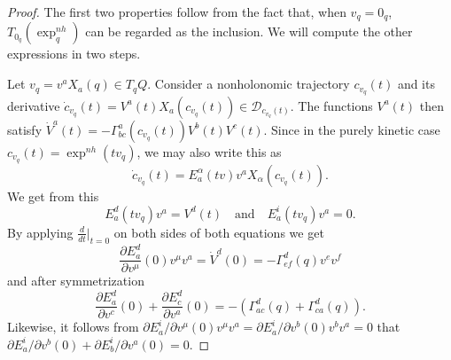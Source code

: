 \documentclass[11pt]{article}
\begin{document}
\begin{proof} The first two properties follow from the fact that, when $v_q=0_q$,   $T_{0_q}(\exp^{nh}_q)$ can be regarded as the inclusion.
We will compute the other expressions in two steps. 

Let $v_q = v^aX_a(q)\in T_qQ$. Consider a nonholonomic trajectory $c_{v_q}(t)$ and its derivative $\dot{c}_{v_q}(t)=V^a(t) X_a\left(c_{v_q}(t)\right) \in \mathcal{D}_{c_{v_q}(t)}$. The functions $V^a(t)$ then satisfy $\dot{V}^a(t)=-\Gamma_{b c}^a\left(c_{v_q}(t)\right) V^b(t) V^c(t)$.
Since in the purely kinetic case {$c_{v_q}(t)=\exp^{nh} \left(t v_q\right)$}, we may also write this as 
\[
\dot{c}_{v_q}(t)=E_a^\alpha(tv) v^a X_\alpha\left(c_{v_q}(t)\right).
\]
We get from this  
$$
E_{a}^d(t v_q) v^a=V^d(t) \quad \text{and} \quad E_a^i(t v_q) v^a=0.
$$
By applying $\frac{d}{dt}|_{t=0}$ on both sides of both equations we get 
$$
\frac{\partial E_a^d}{\partial v^\mu}(0) v^\mu v^a= \dot{V}^d(0)=-\Gamma^d_{ef}(q) v^e v^f
$$ and after symmetrization
$$ \frac{\partial E_a^d}{\partial v^c}(0)+\frac{\partial E_c^d}{\partial v^a}(0) =-(\Gamma_{ac}^d(q)+\Gamma_{ca}^d(q)).
$$
Likewise, it follows from 
$
{\partial E_a^i}/{\partial v^\mu}(0) v^\mu v^a = {\partial E_a^i}/{\partial v^b}(0) v^b v^a=0
$ that 
${\partial E_a^i}/{\partial v^b}(0)+{\partial E_b^i}/{\partial v^a}(0)=0$.



\end{proof}
\end{document}
